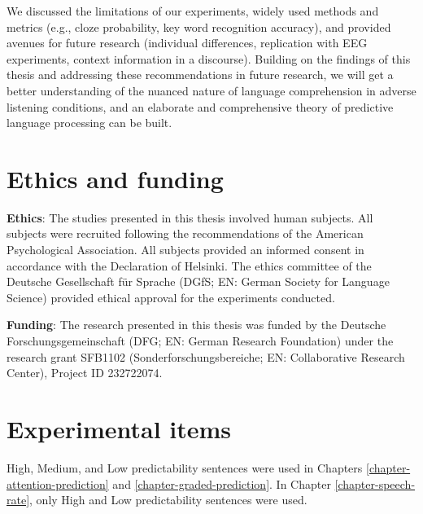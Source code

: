 \documentclass[a4paper, nobind]{templates/ociamthesis}
\begin{document}
We discussed the limitations of our experiments, widely used methods and metrics (e.g., cloze probability, key word recognition accuracy),
and provided avenues for future research (individual differences, replication with EEG experiments, context information in a discourse).
Building on the findings of this thesis and addressing these recommendations in future research,
we will get a better understanding of the nuanced nature of language comprehension in adverse listening conditions,
and an elaborate and comprehensive theory of predictive language processing can be built.

\hypertarget{chapter-ethics}{%
\chapter{Ethics and funding}\label{chapter-ethics}}

\noindent 

\textbf{Ethics}: The studies presented in this thesis involved human subjects.
All subjects were recruited following the recommendations of the American Psychological Association.
All subjects provided an informed consent in accordance with the Declaration of Helsinki.
The ethics committee of the Deutsche Gesellschaft für Sprache (DGfS; EN: German Society for Language Science) provided ethical approval for the experiments conducted.

\textbf{Funding}: The research presented in this thesis was funded by the Deutsche Forschungsgemeinschaft (DFG; EN: German Research Foundation) under the research grant SFB1102 (Sonderforschungsbereiche; EN: Collaborative Research Center), Project ID 232722074.

\startappendices

\hypertarget{appendix-A}{%
\chapter{Experimental items}\label{appendix-A}}

High, Medium, and Low predictability sentences were used in Chapters \ref{chapter-attention-prediction} and \ref{chapter-graded-prediction}.
In Chapter \ref{chapter-speech-rate}, only High and Low predictability sentences were used.
\end{document}
